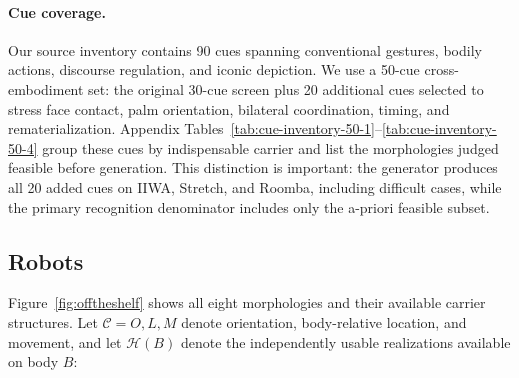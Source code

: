 \documentclass[letterpaper,10pt,conference]{ieeeconf}
\begin{document}
\label{sec:experiment}
\paragraph{Cue coverage.}
Our source inventory contains 90 cues spanning conventional gestures, bodily actions, discourse regulation, and iconic depiction. We use a 50-cue cross-embodiment set: the original 30-cue screen plus 20 additional cues selected to stress face contact, palm orientation, bilateral coordination, timing, and rematerialization. Appendix Tables~\ref{tab:cue-inventory-50-1}--\ref{tab:cue-inventory-50-4} group these cues by indispensable carrier and list the morphologies judged feasible before generation. This distinction is important: the generator produces all 20 added cues on IIWA, Stretch, and Roomba, including difficult cases, while the primary recognition denominator includes only the a-priori feasible subset.

\subsection{Robots}
Figure~\ref{fig:offtheshelf} shows all eight morphologies and their available carrier structures. Let $\mathcal{C}={O,L,M}$ denote orientation, body-relative location, and movement, and let $\mathcal{H}(B)$ denote the independently usable realizations available on body $B$:
\end{document}
